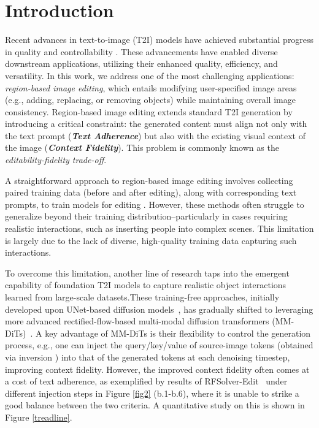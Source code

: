 \documentclass{article}
\begin{document}
\section{Introduction}
\label{Sec:intro}
%

Recent advances in text-to-image (T2I) models have achieved substantial progress in quality and controllability \citep{rombach2022high,betker2023improving,chen2023pixart,esser2024scaling,blackforest2024FLUX}. These advancements have enabled diverse downstream applications, utilizing their enhanced quality, efficiency, and versatility. In this work, we address one of the most challenging applications: \emph{region-based image editing}, which entails modifying user-specified image areas (e.g., adding, replacing, or removing objects) while maintaining {overall image consistency}.
Region-based image editing extends standard T2I generation by introducing a critical constraint: the generated content must align not only with the text prompt {(\textbf{\textit{Text Adherence}})} but also with the existing visual context of the image {(\textbf{\textit{Context Fidelity}})}.
This problem is commonly known as the \textit{editability-fidelity trade-off}.



A straightforward approach to region-based image editing involves collecting paired training data (before and after editing), along with corresponding text prompts, to train models for editing \citep{brooks2023instructpix2pix, zhang2023magicbrush, wasserman2024paint, li2024brushedit, hui2024hq, wei2024omniedit}. However, these methods often struggle to generalize beyond their training distribution--particularly in cases requiring realistic interactions, such as inserting people into complex scenes. This limitation is largely due to the lack of diverse, high-quality training data capturing such interactions.


To overcome this limitation, another line of research taps into the emergent capability of foundation T2I models to capture realistic object interactions learned from large-scale datasets.{These training-free approaches, initially developed upon UNet-based diffusion models~\citep{hertz2022prompt, cao2023masactrl, tumanyan2023plug}, has gradually shifted to leveraging more advanced rectified-flow-based multi-modal diffusion transformers (MM-DiTs)~\citep{rout2024semantic, wang2024taming, deng2024fireflow, tewel2025addit, zhu2025kv}.
A key advantage of MM-DiTs is their flexibility to control the generation process, e.g., one can inject the query/key/value of source-image tokens (obtained via inversion \citep{deng2024fireflow,rout2024semantic,wang2024taming}) into that of the generated tokens at each denoising timestep, improving context fidelity.}
However, the improved context fidelity often comes at a cost of text adherence, as exemplified by results of RFSolver-Edit~\citep{wang2024taming} under different injection steps in  Figure \ref{fig2} (b.1-b.6), where it is unable to strike a good balance between the two criteria. A quantitative study on this is shown in Figure \ref{treadline}.
\end{document}
